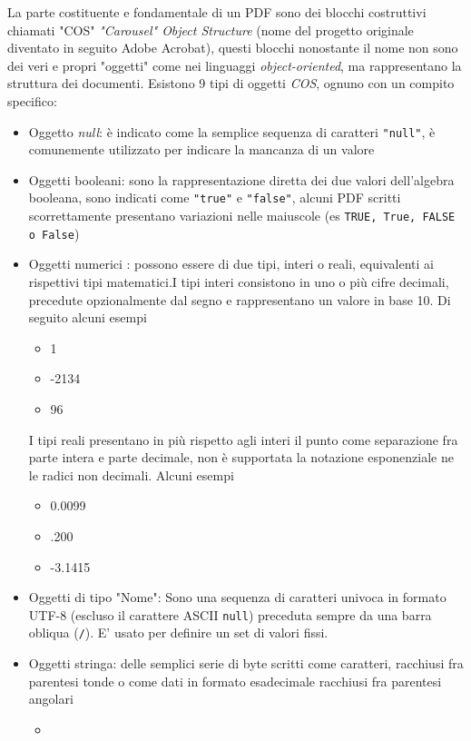 La parte costituente e fondamentale di un PDF sono dei blocchi costruttivi chiamati "COS" \textit{"Carousel" Object Structure} (nome del progetto originale diventato in seguito Adobe Acrobat), questi blocchi nonostante il nome non sono dei veri e propri "oggetti" come nei linguaggi \textit{object-oriented}, ma rappresentano la struttura dei documenti.
Esistono 9 tipi di oggetti \textit{COS}, ognuno con un compito specifico:
\begin{itemize}
	\item Oggetto \textit{null}: è indicato come la semplice sequenza di caratteri \texttt{"null"}, è comunemente utilizzato per indicare la mancanza di un valore
	\item Oggetti booleani: sono la rappresentazione diretta dei due valori dell'algebra booleana, sono indicati come \texttt{"true"} e \texttt{"false"}, alcuni PDF scritti scorrettamente presentano variazioni nelle maiuscole (es \texttt{TRUE, True, FALSE o False})
	\item Oggetti numerici : possono essere di due tipi, interi o reali, equivalenti ai rispettivi tipi matematici.\newline I tipi interi consistono in uno o più cifre decimali, precedute opzionalmente dal segno e rappresentano un valore in base 10. Di seguito alcuni esempi
	 \begin{itemize} 
	 	\item 1 
	 	\item -2134
	 	\item 96
	 \end{itemize}
	 I tipi reali presentano in più rispetto agli interi il punto come separazione fra parte intera e parte decimale, non è supportata la notazione esponenziale ne le radici non decimali. Alcuni esempi
	 \begin{itemize}
	 \item 0.0099
	 \item .200
	 \item -3.1415
	 \end{itemize}
	 \item Oggetti di tipo "Nome": Sono una sequenza di caratteri univoca in formato UTF-8 (escluso il carattere ASCII \texttt{null}) preceduta sempre da una barra obliqua (\texttt{/}). E' usato per definire un set di valori fissi.
	 \item Oggetti stringa: delle semplici serie di byte scritti come caratteri, racchiusi fra parentesi tonde o come dati in formato esadecimale racchiusi fra parentesi angolari
	\begin{itemize}
		\item 
	\end{itemize}
	 
\end{itemize}


















